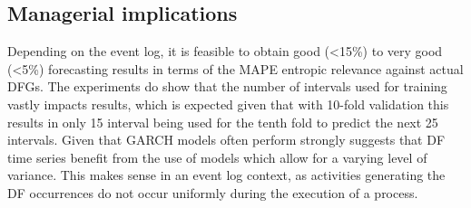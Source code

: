 \subsection{Managerial implications}
Depending on the event log, it is feasible to obtain good (<15\%) to very good (<5\%) forecasting results in terms of the MAPE entropic relevance against actual DFGs.
The experiments do show that the number of intervals used for training vastly impacts results, which is expected given that with 10-fold validation this results in only 15 interval being used for the tenth fold to predict the next 25 intervals.
Given that GARCH models often perform strongly suggests that DF time series benefit from the use of models which allow for a varying level of variance.
This makes sense in an event log context, as activities generating the DF occurrences do not occur uniformly during the execution of a process.

